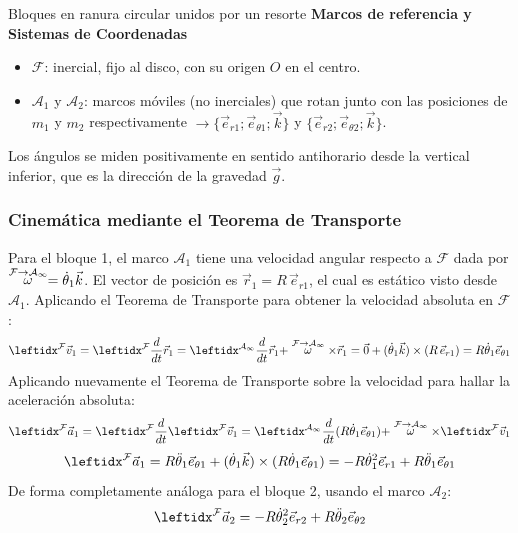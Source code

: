 \begin{solucion}{Bloques en ranura circular unidos por un resorte}
\textbf{Marcos de referencia y Sistemas de Coordenadas}
\begin{itemize}
    \item $\mathcal{F}$: inercial, fijo al disco, con su origen $O$ en el centro.
    \item $\mathcal{A}_1$ y $\mathcal{A}_2$: marcos móviles (no inerciales) que rotan junto con las posiciones de $m_1$ y $m_2$ respectivamente $\longrightarrow\{\vec{e}_{r1};\vec{e}_{\theta1};\vec{k}\}$ y $\{\vec{e}_{r2};\vec{e}_{\theta2};\vec{k}\}$.
\end{itemize}
Los ángulos se miden positivamente en sentido antihorario desde la vertical inferior, que es la dirección de la gravedad $\vec{g}$.

\subsubsection*{Cinemática mediante el Teorema de Transporte}
Para el bloque 1, el marco $\mathcal{A}_1$ tiene una velocidad angular respecto a $\mathcal{F}$ dada por $\stackrel{\mathcal{F} \to \mathcal{A_1}}{\omega}=\dot{\theta}_1 \vec{k}$. El vector de posición es $\vec{r}_1 = R\,\vec{e}_{r1}$, el cual es estático visto desde $\mathcal{A}_1$. Aplicando el Teorema de Transporte para obtener la velocidad absoluta en $\mathcal{F}$:
$$\marc{\vec{v}_1}{F}{} = \der{\vec{r}_1}{F}{} = \der{\vec{r}_1}{A_1}{} + \velang{F}{A_1}\times\vec{r}_1 = \vec{0} + (\dot{\theta}_1 \vec{k}) \times (R\,\vec{e}_{r1}) = R\dot{\theta}_1 \vec{e}_{\theta 1}$$
Aplicando nuevamente el Teorema de Transporte sobre la velocidad para hallar la aceleración absoluta:
$$\marc{\vec{a}_1}{F}{} = \der{\marc{\vec{v}_1}{F}{}}{F}{} = \der{(R\dot{\theta}_1 \vec{e}_{\theta 1})}{A_1}{} + \velang{F}{A_1}\times\marc{\vec{v}_1}{F}{}$$
$$\marc{\vec{a}_1}{F}{} = R\ddot{\theta}_1 \vec{e}_{\theta 1} + (\dot{\theta}_1 \vec{k}) \times (R\dot{\theta}_1 \vec{e}_{\theta 1}) = -R\dot{\theta}_1^2 \vec{e}_{r1} + R\ddot{\theta}_1 \vec{e}_{\theta 1}$$
De forma completamente análoga para el bloque 2, usando el marco $\mathcal{A}_2$:
$$\marc{\vec{a}_2}{F}{} = -R\dot{\theta}_2^2 \vec{e}_{r2} + R\ddot{\theta}_2 \vec{e}_{\theta 2}$$


\end{solucion}
